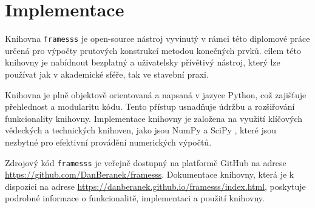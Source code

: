 \section{Implementace}

Knihovna \texttt{framesss} je open-source nástroj vyvinutý v rámci této diplomové práce určená pro výpočty prutových konstrukcí metodou konečných prvků. cílem této knihovny je nabídnout bezplatný a uživatelsky přívětivý nástroj, který lze používat jak v akademické sféře, tak ve stavební praxi. 

Knihovna je plně objektově orientovaná a napsaná v jazyce Python, což zajišťuje přehlednost a modularitu kódu. Tento přístup usnadňuje údržbu a rozšiřování funkcionality knihovny. Implementace knihovny je založena na využití klíčových vědeckých a technických knihoven, jako jsou NumPy \cite{numpy} a SciPy \cite{scipy}, které jsou nezbytné pro efektivní provádění numerických výpočtů.

Zdrojový kód \texttt{framesss} je veřejně dostupný na platformě GitHub na adrese \url{https://github.com/DanBeranek/framesss}. Dokumentace knihovny, která je k dispozici na adrese \url{https://danberanek.github.io/framesss/index.html}, poskytuje podrobné informace o funkcionalitě, implementaci a použití knihovny.

\renewcommand*{\arraystretch}{0.8}







